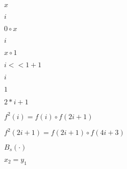 \documentclass[10pt]{book}
\begin{document}
\begin{mdSnippets}
\begin{mdInlineSnippet}[9dd4e461268c8034f5c8564e155c67a6]%
$x$\end{mdInlineSnippet}%
\begin{mdInlineSnippet}[865c0c0b4ab0e063e5caa3387c1a8741]%
$i$\end{mdInlineSnippet}%
\begin{mdInlineSnippet}[445f7bd15121ee5cda9b16554b63ab07]%
$0 \circ x$\end{mdInlineSnippet}%
\begin{mdInlineSnippet}[865c0c0b4ab0e063e5caa3387c1a8741]%
$i$\end{mdInlineSnippet}%
\begin{mdInlineSnippet}[090d568f431ca104ba77114b8d8b0aa4]%
$x \circ 1$\end{mdInlineSnippet}%
\begin{mdInlineSnippet}[7fb10e36b1635147f1bf75a44e784559]%
$i << 1 + 1$\end{mdInlineSnippet}%
\begin{mdInlineSnippet}[865c0c0b4ab0e063e5caa3387c1a8741]%
$i$\end{mdInlineSnippet}%
\begin{mdInlineSnippet}[c4ca4238a0b923820dcc509a6f75849b]%
$1$\end{mdInlineSnippet}%
\begin{mdInlineSnippet}[8379959fd17a4e6ee5f6ca16570517f6]%
$2*i + 1$\end{mdInlineSnippet}%
\begin{mdInlineSnippet}[4638bca282648c9c330f07c481645426]%
$f^2(i) = f(i) \circ f(2i + 1)$\end{mdInlineSnippet}%
\begin{mdInlineSnippet}[ce2521ab304d66006698e3e3fcdb4ed0]%
$f^2(2i + 1) = f(2i + 1) \circ f(4i + 3)$\end{mdInlineSnippet}%
\begin{mdInlineSnippet}[845fe607884452a94e0eb68e732c447b]%
$B_s(\cdot)$\end{mdInlineSnippet}%
\begin{mdInlineSnippet}[cd266410404ac9879b1e669541a4d14a]%
$x_2 = y_1$\end{mdInlineSnippet}%

\end{mdSnippets}
\end{document}

